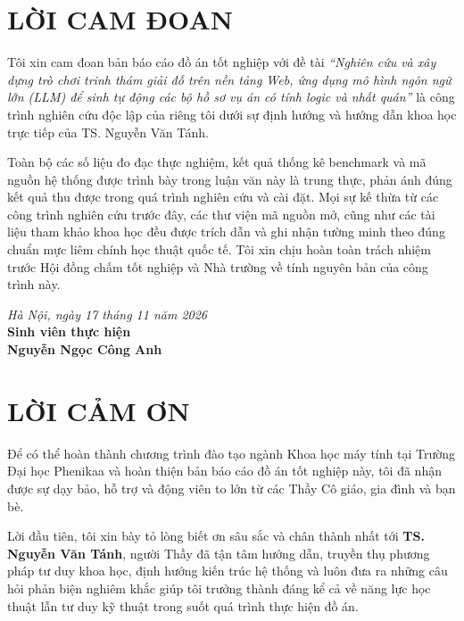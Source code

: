 \newpage
\chapter*{LỜI CAM ĐOAN}

Tôi xin cam đoan bản báo cáo đồ án tốt nghiệp với đề tài \textit{``Nghiên cứu và xây dựng trò chơi trinh thám giải đố trên nền tảng Web, ứng dụng mô hình ngôn ngữ lớn (LLM) để sinh tự động các bộ hồ sơ vụ án có tính logic và nhất quán''} là công trình nghiên cứu độc lập của riêng tôi dưới sự định hướng và hướng dẫn khoa học trực tiếp của TS. Nguyễn Văn Tánh.

Toàn bộ các số liệu đo đạc thực nghiệm, kết quả thống kê benchmark và mã nguồn hệ thống được trình bày trong luận văn này là trung thực, phản ánh đúng kết quả thu được trong quá trình nghiên cứu và cài đặt. Mọi sự kế thừa từ các công trình nghiên cứu trước đây, các thư viện mã nguồn mở, cũng như các tài liệu tham khảo khoa học đều được trích dẫn và ghi nhận tường minh theo đúng chuẩn mực liêm chính học thuật quốc tế. Tôi xin chịu hoàn toàn trách nhiệm trước Hội đồng chấm tốt nghiệp và Nhà trường về tính nguyên bản của công trình này.

\vspace{1.5cm}
\begin{flushright}
    \textit{Hà Nội, ngày 17 tháng 11 năm 2026}\\[0.2cm]
    \textbf{Sinh viên thực hiện}\\[1.5cm]
    \textbf{Nguyễn Ngọc Công Anh}
\end{flushright}

\newpage
\chapter*{LỜI CẢM ƠN}

Để có thể hoàn thành chương trình đào tạo ngành Khoa học máy tính tại Trường Đại học Phenikaa và hoàn thiện bản báo cáo đồ án tốt nghiệp này, tôi đã nhận được sự dạy bảo, hỗ trợ và động viên to lớn từ các Thầy Cô giáo, gia đình và bạn bè.

Lời đầu tiên, tôi xin bày tỏ lòng biết ơn sâu sắc và chân thành nhất tới \textbf{TS. Nguyễn Văn Tánh}, người Thầy đã tận tâm hướng dẫn, truyền thụ phương pháp tư duy khoa học, định hướng kiến trúc hệ thống và luôn đưa ra những câu hỏi phản biện nghiêm khắc giúp tôi trưởng thành đáng kể cả về năng lực học thuật lẫn tư duy kỹ thuật trong suốt quá trình thực hiện đồ án.

